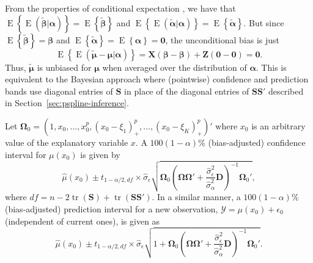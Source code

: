 \documentclass[cmfont,usenames,dvipsnames,leqno]{afit-etd}\usepackage[]{graphicx}\usepackage[]{color}
\newcommand{\mc}[1]{\ensuremath{\mathcal{#1}}}
\newcommand{\wh}[1]{\ensuremath{\widehat{#1}}}
\newcommand{\wt}[1]{\ensuremath{\widetilde{#1}}}
\newcommand{\tquant}[2]{\ensuremath{t_{#1,#2}}}
\newcommand{\E}{\operatorname{E}}
\newcommand{\tr}{\operatorname{tr}}
\begin{document}
From the properties of conditional expectation \citep[pg. 164]{casella_statistical_2002}, we have that $\E\left\{\E\left(\wt{\bm{\beta}}|\bm{\alpha}\right)\right\} = \E\left\{\wt{\bm{\beta}}\right\}$ and $\E\left\{\E\left(\wt{\bm{\alpha}}|\bm{\alpha}\right)\right\} = \E\left\{\wt{\bm{\alpha}}\right\}$. But since $\E\left\{\wt{\bm{\beta}}\right\} = \bm{\beta}$ and $\E\left\{\wt{\bm{\alpha}}\right\} = \E\left\{\bm{\alpha}\right\} = \bm{0}$, the unconditional bias is just 
\begin{equation*}
  \E\left\{\E\left(\wt{\bm{\mu}} - \bm{\mu}|\bm{\alpha}\right)\right\} = \bm{X}\left(\bm{\beta} - \bm{\beta}\right) + \bm{Z}\left(\bm{0} - \bm{0}\right) = \bm{0}. 
\end{equation*}
Thus, $\wt{\bm{\mu}}$ is unbiased for $\bm{\mu}$ when averaged over the distribution of $\bm{\alpha}$. This is equivalent to the Bayesian approach where (pointwise) confidence and prediction bands use diagonal entries of $\bm{S}$ in place of the diagonal entries of $\bm{S}\bm{S}'$ described in Section~\ref{sec:pspline-inference}.

Let $\bm{\Omega}_0 = \left(1, x_0, \dotsc, x_0^p, (x_0 - \xi_1)_+^p, \dotsc, (x_0 - \xi_K)_+^p\right)'$ where $x_0$ is an arbitrary value of the explanatory variable $x$. A $100(1 - \alpha)\%$ (bias-adjusted) confidence interval for $\mu(x_0)$ is given by
\begin{equation*}
  \wh{\mu}(x_0) \pm \tquant{1-\alpha/2}{df} \times \wh{\sigma}_\epsilon\sqrt{\bm{\Omega}_0\left(\bm{\Omega}\bm{\Omega}' + \frac{\wh{\sigma}_\epsilon^2}{\wh{\sigma}_\alpha^2}\bm{D} \right)^{-1}\bm{\Omega}_0'},
\end{equation*}
where $df = n - 2\tr\left(\bm{S}\right) + \tr\left(\bm{S}\bm{S}'\right)$. In a similar manner, a $100(1 - \alpha)\%$ (bias-adjusted) prediction interval for a new observation, $\mc{Y} = \mu(x_0) + \epsilon_0$ (independent of current ones), is given as
\begin{equation}
\label{eqn:bias-adjusted-pi}
  \wh{\mu}(x_0) \pm \tquant{1-\alpha/2}{df} \times \wh{\sigma}_\epsilon\sqrt{1 + \bm{\Omega}_0\left(\bm{\Omega}\bm{\Omega}' + \frac{\wh{\sigma}_\epsilon^2}{\wh{\sigma}_\alpha^2}\bm{D} \right)^{-1}\bm{\Omega}_0'}.
\end{equation}
\end{document}
